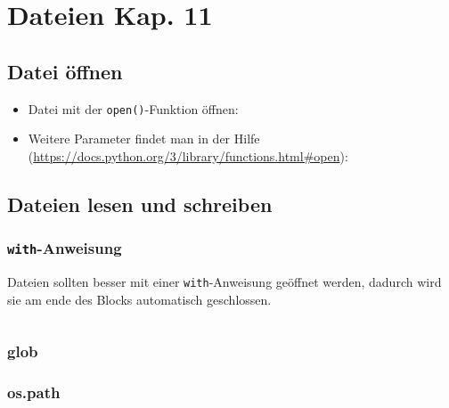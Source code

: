 \pagebreak
\section[Dateien]{Dateien \tiny{Kap. 11}}

\subsection{Datei öffnen}
\begin{itemize}
	\item Datei mit der \texttt{open()}-Funktion öffnen:
	
	\item Weitere Parameter findet man in der Hilfe (\url{https://docs.python.org/3/library/functions.html#open}):
	
\end{itemize}

\subsection{Dateien lesen und schreiben}




\begin{minipage}[t]{0.49\textwidth}
	\subsubsection{\texttt{with}-Anweisung}
	Dateien sollten besser mit einer \texttt{with}-Anweisung geöffnet werden, dadurch wird sie am ende des Blocks automatisch geschlossen.
\end{minipage}
\begin{minipage}[t]{0.02\textwidth} $ \quad $\end{minipage}
\begin{minipage}[t]{0.49\textwidth}
	
\end{minipage}



\subsubsection{glob}


\subsubsection{os.path}


